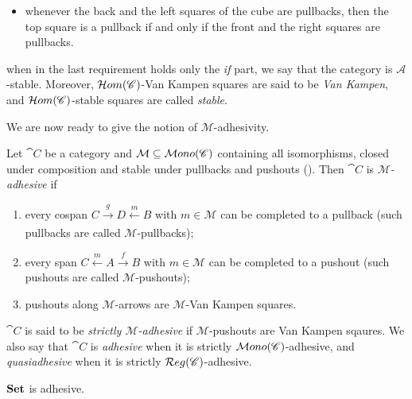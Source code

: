 \begin{definition}
\begin{itemize}
	\item whenever the back and the left squares of the cube are pullbacks, then the top square is a pullback if and only if the front and the right squares are pullbacks.
    \end{itemize}
	when in the last requirement holds only the \textit{if} part, we say that the category is $\mathcal{A}$-stable. Moreover, $\mathcal{H}om(\mathscr{C})$-Van Kampen squares are said to be \emph{Van Kampen}, and $\mathcal{H}om(\mathscr{C})$-stable squares are called \emph{stable}.
\end{definition}

We are now ready to give the notion of $\mathcal M$-adhesivity. %

\begin{definition}\label{def:adh}
    Let $\cat C$ be a category and $\mathcal M \subseteq \mathcal{M}ono(\mathscr{C})$ containing all isomorphisms, closed under composition and stable under pullbacks and pushouts ().
    Then $\cat C$ is \emph{$\mathcal M$-adhesive} if
    \begin{enumerate}
        \item every cospan $C \xrightarrow[]{g} D \xleftarrow[]{m} B$ with $m \in \mathcal M$ can be completed to a pullback (such pullbacks are called $\mathcal M$-pullbacks);
        \item every span $C \xleftarrow{m} A \xrightarrow{f} B$ with $ m \in \mathcal M$ can be completed to a pushout (such pushouts are called $\mathcal M$-pushouts);
        \item pushouts along $\mathcal M$-arrows are $\mathcal M$-Van Kampen squares.
    \end{enumerate}
	$\cat C$ is said to be \emph{strictly $\mathcal{M}$-adhesive} if $\mathcal{M}$-pushouts are Van Kampen sqaures.
	We also say that $\cat C$ is \emph{adhesive} when it is strictly $\mathcal{M}ono(\mathscr{C})$-adhesive, and \emph{quasiadhesive} when it is strictly $\mathcal{R}eg(\mathscr{C})$-adhesive.%
\end{definition}



\begin{obs}
    $\mathbf{Set}$ is adhesive.
\end{obs}

